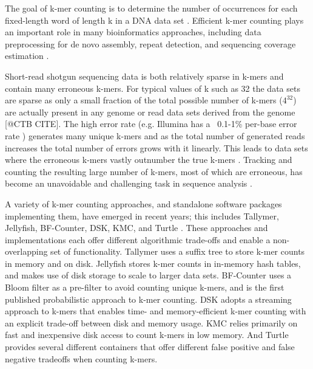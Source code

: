 \documentclass{article}
\begin{document}
The goal of k-mer counting is to determine the number of occurrences
for each fixed-length word of length k in a DNA data set
\cite{Marcais2011}. Efficient k-mer counting plays an important role
in many bioinformatics approaches, including data preprocessing for de
novo assembly, repeat detection, and sequencing coverage estimation
\cite{Kurtz2008}.


Short-read shotgun sequencing data is both relatively sparse in
k-mers and contain many erroneous k-mers.  For typical values of k such as 32 the data sets are sparse as only a small fraction of
the total possible number of k-mers ($4^{32}$) are actually present in
any genome or read data sets derived from the genome [@CTB CITE].  The high error rate (e.g. Illumina has a ~0.1-1\%
per-base error rate \cite{pubmed19997069}) generates many unique k-mers and as the total number of generated reads increases the
total number of errors grows with it linearly. This leads to data sets where the
erroneous k-mers vastly outnumber the true k-mers \cite{Conway2011}.
Tracking and counting the resulting large number of k-mers, most of
which are erroneous, has become an unavoidable and challenging task
in sequence analysis
\cite{Minoche2011}.

A variety of k-mer counting approaches, and standalone software
packages implementing them, have emerged in recent years; this
includes Tallymer, Jellyfish, BF-Counter, DSK, KMC, and Turtle \cite{Kurtz2008,Marcais2011, Melsted2011, Rizk2013, Deorowicz2013, Roy2013}.
These
approaches and implementations each offer different algorithmic
trade-offs and enable a non-overlapping set
of functionality.  Tallymer uses a suffix tree to store k-mer counts
in memory and on disk.  Jellyfish stores k-mer counts in in-memory
hash tables, and makes use of disk storage to scale to larger
data sets.  BF-Counter uses a Bloom filter as a pre-filter to avoid
counting unique k-mers, and is the first published probabilistic approach
to k-mer counting.  DSK adopts a streaming approach to k-mers that
enables time- and memory-efficient k-mer counting with an explicit
trade-off between disk and memory usage.  KMC relies primarily
on fast and inexpensive disk access to count k-mers in low
memory.  And Turtle provides several different containers that offer
different false positive and false negative tradeoffs when counting k-mers.
\end{document}
